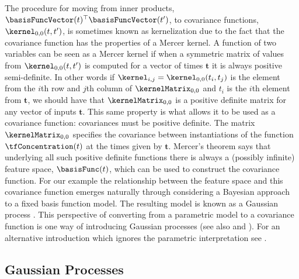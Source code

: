 \documentclass{article}
\begin{document}
The procedure for moving from inner products,
$\basisFuncVector(t)^\top\basisFuncVector(t^\prime)$, to covariance functions,
$\kernel_{0,0}(t, t^\prime)$, is sometimes known as kernelization
\citep{Scholkopf:learning01} due to the fact that the covariance
function has the properties of a Mercer kernel. A function of two variables can be seen as a Mercer kernel if when a
symmetric matrix of values from $\kernel_{0,0}(t, t^\prime)$ is computed
for a vector of times $\mathbf{t}$ it is always positive
semi-definite. In other words if $\kernel_{i,j} = \kernel_{0,0}(t_i,
t_j)$ is the element from the $i$th row and $j$th column of
$\kernelMatrix_{0,0}$ and $t_i$ is the $i$th element from $\mathbf{t}$, we
should have that $\kernelMatrix_{0,0}$ is a positive definite matrix for any
vector of inputs $\mathbf{t}$. This same property is what allows it to
be used as a covariance function: covariances must be positive
definite. The matrix $\kernelMatrix_{0,0}$ specifies the covariance between
instantiations of the function $\tfConcentration(t)$ at the times
given by $\mathbf{t}$. Mercer's theorem says that underlying all such
positive definite functions there is always a (possibly infinite)
feature space, $\basisFunc(t)$, which can be used to construct the
covariance function. For our example the relationship between the
feature space and this covariance function emerges naturally through
considering a Bayesian approach to a fixed basis function model. The
resulting model is known as a Gaussian process
\citep{Ohagan:curve78}. This perspective of converting from a
parametric model to a covariance function is one way of introducing
Gaussian processes (see also \citet{Williams:Gaussian95} and
\citet{Rasmussen:book06}). For an alternative introduction which
ignores the parametric interpretation see
\citet{Lawrence:licsbgp10}. 


\subsection{Gaussian Processes}
\end{document}
